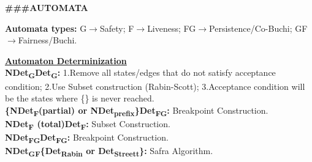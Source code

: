 \documentclass{article}
\begin{document}
\begin{multicols}{4}


\textbf{\#\#\#AUTOMATA}

\textbf{Automata types:} G$\rightarrow$Safety; F$\rightarrow$Liveness; FG$\rightarrow$Persistence/Co-Buchi; GF$\rightarrow$Fairness/Buchi.

\textbf{\underline{Automaton Determinization}}\\
\textbf{NDet\textsubscript{G}\textrightarrow Det\textsubscript{G}:} 
1.Remove all states/edges that do not satisfy acceptance condition;
2.Use Subset construction (Rabin-Scott);
3.Acceptance condition will be the states where \{\} is never reached. \\
\textbf{\{NDet\textsubscript{F}(partial) or NDet\textsubscript{prefix}\}\textrightarrow Det\textsubscript{FG}:} 
Breakpoint Construction. \\
\textbf{NDet\textsubscript{F} (total)\textrightarrow Det\textsubscript{F}:}
Subset Construction. \\
\textbf{NDet\textsubscript{FG}\textrightarrow Det\textsubscript{FG}:}
Breakpoint Construction.\\
\textbf{NDet\textsubscript{GF}\textrightarrow \{Det\textsubscript{Rabin} or Det\textsubscript{Streett}\}:}
Safra Algorithm.



\end{multicols}
\end{document}
